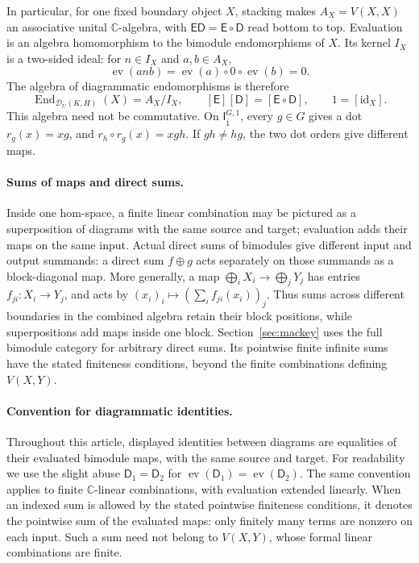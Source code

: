 \documentclass[11pt,a4paper]{article}
\numberwithin{equation}{section}
\theoremstyle{definition}
\newcommand{\C}{\mathbb C}
\newcommand{\End}{\operatorname{End}}
\newcommand{\id}{\mathrm{id}}
\newcommand{\I}{\mathsf I}
\begin{document}
In particular, for one fixed boundary object \(X\), stacking makes
\(A_X=V(X,X)\) an associative unital \(\C\)-algebra, with
\(\mathsf E\mathsf D=\mathsf E\circ\mathsf D\) read bottom to top.
Evaluation is an algebra homomorphism to the bimodule endomorphisms
of \(X\). Its kernel \(I_X\) is a two-sided ideal: for
\(n\in I_X\) and \(a,b\in A_X\),
\[
 \operatorname{ev}(anb)
   =\operatorname{ev}(a)\circ0\circ\operatorname{ev}(b)=0.
\]
The algebra of diagrammatic endomorphisms is therefore
\[
 \End_{\mathcal D_U(K,H)}(X)=A_X/I_X,
 \qquad [\mathsf E][\mathsf D]=[\mathsf E\circ\mathsf D],
 \qquad 1=[\id_X].
\]
This algebra need not be commutative. On \(\I_{\bar1}^{G,1}\), every
\(g\in G\) gives a dot \(r_g(x)=xg\), and
\(r_h\circ r_g(x)=xgh\). If \(gh\ne hg\), the two dot orders give
different maps.

\paragraph{Sums of maps and direct sums.}
Inside one hom-space, a finite linear combination may be pictured
as a superposition of diagrams with the same source and target;
evaluation adds their maps on the same input. Actual direct sums
of bimodules give different input and output summands: a direct sum
\(f\oplus g\) acts separately on those summands as a block-diagonal
map. More generally, a map
\(\bigoplus_i X_i\to\bigoplus_jY_j\) has entries
\(f_{ji}:X_i\to Y_j\), and acts by
\((x_i)_i\mapsto(\sum_i f_{ji}(x_i))_j\).
Thus sums across different boundaries in the combined algebra retain
their block positions, while superpositions add maps inside one block.
Section~\ref{sec:mackey} uses the full bimodule category for arbitrary
direct sums. Its pointwise finite infinite sums have the stated
finiteness conditions, beyond the finite combinations defining
\(V(X,Y)\).

\paragraph{Convention for diagrammatic identities.}
Throughout this article, displayed identities between diagrams are equalities
of their evaluated bimodule maps, with the same source and target.
For readability we use the slight abuse \(\mathsf D_1=\mathsf D_2\)
for \(\operatorname{ev}(\mathsf D_1)=\operatorname{ev}(\mathsf D_2)\).
The same convention applies to finite \(\C\)-linear combinations,
with evaluation extended linearly. When an indexed sum is allowed by
the stated pointwise finiteness conditions, it denotes the pointwise
sum of the evaluated maps: only finitely many terms are nonzero on
each input. Such a sum need not belong to \(V(X,Y)\), whose formal
linear combinations are finite.
\end{document}
